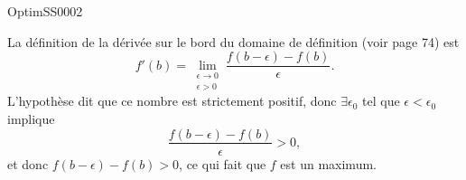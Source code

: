 
\begin{corrige}{OptimSS0002}

La définition de la dérivée sur le bord du domaine de définition (voir page 74) est
\begin{equation}
	f'(b)=\lim_{\substack{\epsilon\to 0\\\epsilon>0}}\frac{ f(b-\epsilon)-f(b) }{ \epsilon }.
\end{equation}
L'hypothèse dit que ce nombre est strictement positif, donc $\exists\epsilon_0$ tel que $\epsilon<\epsilon_0$ implique
\begin{equation}
	\frac{ f(b-\epsilon)-f(b) }{ \epsilon }>0,
\end{equation}
 et donc $f(b-\epsilon)-f(b)>0$, ce qui fait que $f$ est un maximum.

\end{corrige}
